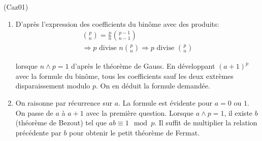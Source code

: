 \begin{tiny}(Caz01)\end{tiny}
\begin{enumerate}
 \item D'après l'expression des coefficients du binôme avec des produits:
 \begin{multline*}
  \binom{p}{n} = \frac{p}{n} \binom{p-1}{n-1}\\
  \Rightarrow
  p \text{ divise } n \binom{p}{n}
  \Rightarrow
  p \text{ divise } \binom{p}{n}
 \end{multline*}

 
lorsque $n\wedge p = 1$ d'après le théorème de Gauss.\newline
En développant $(a+1)^p$ avec la formule du binôme, tous les coefficients sauf les deux extrèmes disparaissement modulo $p$. On en déduit la formule demandée.
 \item On raisonne par  récurrence sur $a$. La formule est évidente pour $a= 0$ ou $1$. On passe de $a$ à $a+1$ avec la première question.\newline
 Lorsque $a\wedge p = 1$, il existe $b$ (théorème de Bezout) tel que $ab \equiv 1 \mod p$. Il suffit de multiplier la relation précédente par $b$ pour obtenir le petit théorème de Fermat. 
\end{enumerate}
